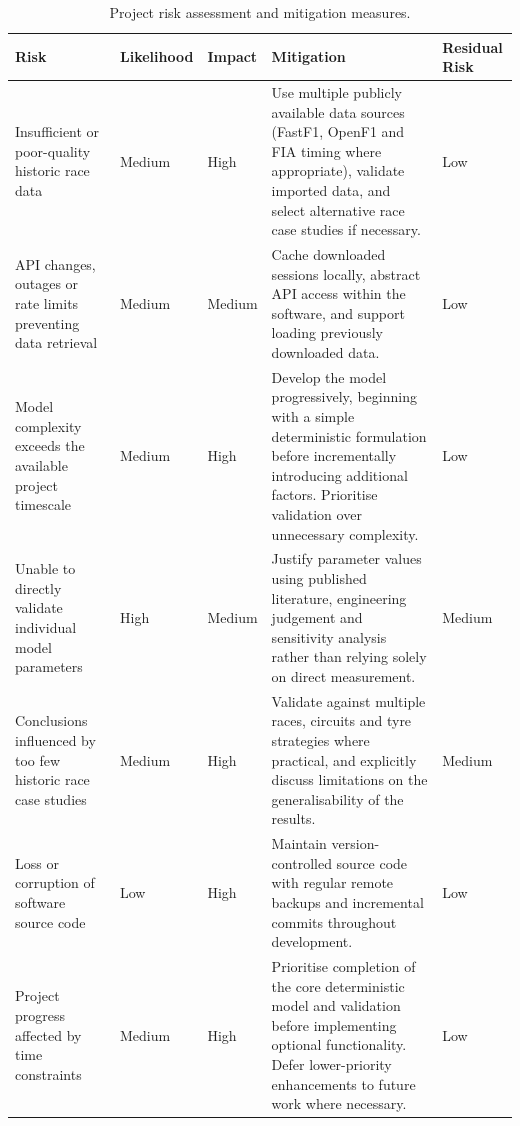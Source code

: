 \begin{table}[htbp]
\centering
\caption{Project risk assessment and mitigation measures.}
\label{tab:project-risks}

\small
\renewcommand{\arraystretch}{1.3}

\begin{tabularx}{\textwidth}{|
>{\raggedright\arraybackslash}p{}|
>{\centering\arraybackslash}p{}|
>{\centering\arraybackslash}p{}|
X|
>{\centering\arraybackslash}p{}|}
\hline

\textbf{Risk} &
\textbf{Likelihood} &
\textbf{Impact} &
\textbf{Mitigation} &
\textbf{Residual Risk}
\\
\hline

Insufficient or poor-quality historic race data &
Medium &
High &
Use multiple publicly available data sources (FastF1, OpenF1 and FIA timing where appropriate), validate imported data, and select alternative race case studies if necessary. &
Low
\\
\hline

API changes, outages or rate limits preventing data retrieval &
Medium &
Medium &
Cache downloaded sessions locally, abstract API access within the software, and support loading previously downloaded data. &
Low
\\
\hline

Model complexity exceeds the available project timescale &
Medium &
High &
Develop the model progressively, beginning with a simple deterministic formulation before incrementally introducing additional factors. Prioritise validation over unnecessary complexity. &
Low
\\
\hline

Unable to directly validate individual model parameters &
High &
Medium &
Justify parameter values using published literature, engineering judgement and sensitivity analysis rather than relying solely on direct measurement. &
Medium
\\
\hline

Conclusions influenced by too few historic race case studies &
Medium &
High &
Validate against multiple races, circuits and tyre strategies where practical, and explicitly discuss limitations on the generalisability of the results. &
Medium
\\
\hline

Loss or corruption of software source code &
Low &
High &
Maintain version-controlled source code with regular remote backups and incremental commits throughout development. &
Low
\\
\hline

Project progress affected by time constraints &
Medium &
High &
Prioritise completion of the core deterministic model and validation before implementing optional functionality. Defer lower-priority enhancements to future work where necessary. &
Low
\\
\hline

\end{tabularx}
\end{table}